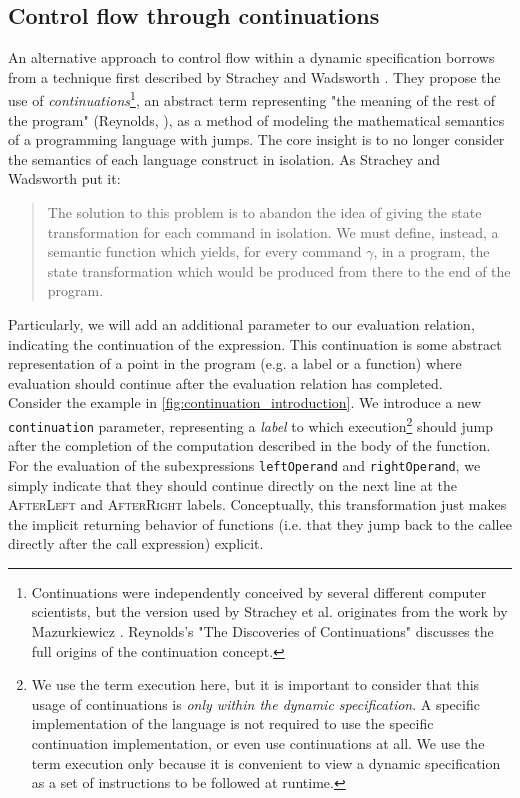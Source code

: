 \subsection{Control flow through continuations}
An alternative approach to control flow within a dynamic specification borrows from a technique first described by Strachey and Wadsworth \cite{continuations_mathematical_semantics}. They propose the use of \textit{continuations}\footnote{Continuations were independently conceived by several different computer scientists, but the version used by Strachey et al. originates from the work by Mazurkiewicz \cite{Mazurkiewicz71}. Reynolds's "The Discoveries of Continuations" \cite{Reynolds93} discusses the full origins of the continuation concept.}, an abstract term representing "the meaning of the rest of the program" (Reynolds,  \cite{Reynolds93}), as a method of modeling the mathematical semantics of a programming language with jumps. The core insight is to no longer consider the semantics of each language construct in isolation. As Strachey and Wadsworth put it:

\begin{quote}
The solution to this problem is to abandon the idea of giving the state transformation for each command in isolation. We must define, instead, a semantic function which yields, for every command $\gamma$, in a program, the state transformation which would be produced from there to the end of the program.
\end{quote}

Particularly, we will add an additional parameter to our evaluation relation, indicating the continuation of the expression. This continuation is some abstract representation of a point in the program (e.g. a label or a function) where evaluation should continue after the evaluation relation has completed.\\

Consider the example in \cref{fig:continuation_introduction}. We introduce a new \texttt{continuation} parameter, representing a \textit{label} to which execution\footnote{We use the term execution here, but it is important to consider that this usage of continuations is \textit{only within the dynamic specification}. A specific implementation of the language is not required to use the specific continuation implementation, or even use continuations at all. We use the term execution only because it is convenient to view a dynamic specification as a set of instructions to be followed at runtime.} should jump after the completion of the computation described in the body of the function. For the evaluation of the subexpressions \texttt{leftOperand} and \texttt{rightOperand}, we simply indicate that they should continue directly on the next line at the \textsc{AfterLeft} and \textsc{AfterRight} labels. Conceptually, this transformation just makes the implicit returning behavior of functions (i.e. that they jump back to the callee directly after the call expression) explicit.\\

